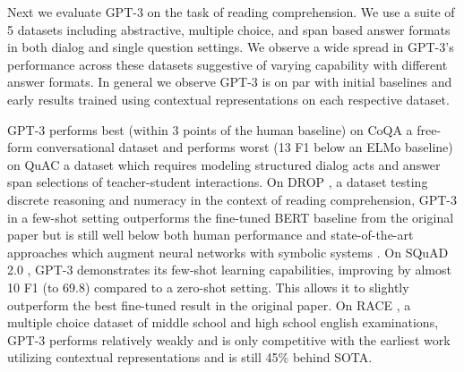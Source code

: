

Next we evaluate GPT-3 on the task of reading comprehension. We use a suite of 5 datasets including abstractive, multiple choice, and span based answer formats in both dialog and single question settings. We observe a wide spread in GPT-3's performance across these datasets suggestive of varying capability with different answer formats. In general we observe GPT-3 is on par with initial baselines and early results trained using contextual representations on each respective dataset.

GPT-3 performs best (within 3 points of the human baseline) on CoQA \cite{reddy2019coqa} a free-form conversational dataset and performs worst (13 F1 below an ELMo baseline) on QuAC \cite{choi2018quac} a dataset which requires modeling structured dialog acts and answer span selections of teacher-student interactions. On DROP \cite{dua2019drop}, a dataset testing discrete reasoning and numeracy in the context of reading comprehension, GPT-3 in a few-shot setting outperforms the fine-tuned BERT baseline from the original paper but is still well below both human performance and state-of-the-art approaches which augment neural networks with symbolic systems \cite{ran2019numnet}. On SQuAD 2.0 \cite{rajpurkar2018know}, GPT-3 demonstrates its few-shot learning capabilities, improving by almost 10 F1 (to 69.8) compared to a zero-shot setting. This allows it to slightly outperform the best fine-tuned result in the original paper. On RACE \cite{lai2017race}, a multiple choice dataset of middle school and high school english examinations, GPT-3 performs relatively weakly and is only competitive with the earliest work utilizing contextual representations and is still 45\% behind SOTA.
